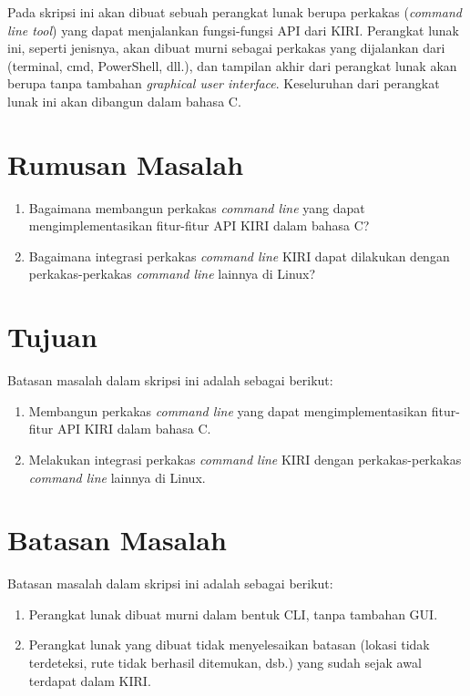 Pada skripsi ini akan dibuat sebuah perangkat lunak berupa perkakas \cl (\textit{command line tool}) yang dapat menjalankan fungsi-fungsi API dari KIRI. Perangkat lunak ini, seperti jenisnya, akan dibuat murni sebagai perkakas yang dijalankan dari \cl (terminal, cmd, PowerShell, dll.), dan tampilan akhir dari perangkat lunak akan berupa \cli tanpa tambahan \textit{graphical user interface}. Keseluruhan dari perangkat lunak ini akan dibangun dalam bahasa C.

\section{Rumusan Masalah}
\label{sec:rumusan}
\begin{enumerate}
	\item Bagaimana membangun perkakas \textit{command line} yang dapat mengimplementasikan fitur-fitur API KIRI dalam bahasa C?
	\item Bagaimana integrasi perkakas \textit{command line} KIRI dapat dilakukan dengan perkakas-perkakas \textit{command line} lainnya di Linux?
\end{enumerate}

\section{Tujuan}
\label{sec:tujuan}
Batasan masalah dalam skripsi ini adalah sebagai berikut:
\begin{enumerate}
	\item Membangun perkakas \textit{command line} yang dapat mengimplementasikan fitur-fitur API KIRI dalam bahasa C.
	\item Melakukan integrasi perkakas \textit{command line} KIRI dengan perkakas-perkakas \textit{command line} lainnya di Linux.
\end{enumerate}

\section{Batasan Masalah}
\label{sec:batasan}
Batasan masalah dalam skripsi ini adalah sebagai berikut:
\begin{enumerate}
	\item Perangkat lunak dibuat murni dalam bentuk CLI, tanpa tambahan GUI.
	\item Perangkat lunak yang dibuat tidak menyelesaikan batasan (lokasi tidak terdeteksi, rute tidak berhasil ditemukan, dsb.) yang sudah sejak awal terdapat dalam KIRI.
\end{enumerate}

